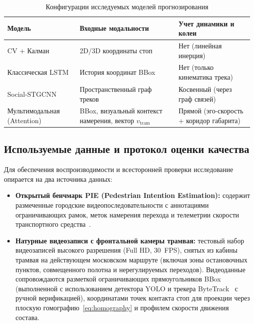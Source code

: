 \documentclass{misisarticle}
\begin{document}
\begin{table}[htbp]
  \caption{Конфигурации исследуемых моделей прогнозирования}
  \label{tab:models}
  \centering
  \begin{tabular}{p{}p{}p{}}
    \toprule
    \textbf{Модель} & \textbf{Входные модальности} & \textbf{Учет динамики и колеи} \\
    \toprule
    CV + Калман & 2D/3D координаты стоп & Нет (линейная инерция) \\
    Классическая LSTM & История координат BBox & Нет (только кинематика трека) \\
    Social-STGCNN & Пространственный граф треков & Косвенный (через граф связей) \\
    Мультимодальная (Attention) & BBox, визуальный контекст намерения, вектор $v_{\text{tram}}$ & Прямой (эго-скорость + коридор габарита) \\
    \bottomrule
  \end{tabular}
\end{table}

\subsection{Используемые данные и протокол оценки качества}

Для обеспечения воспроизводимости и всесторонней проверки исследование опирается на два источника данных:
\begin{itemize}
  \item \textbf{Открытый бенчмарк PIE (Pedestrian Intention Estimation):} содержит размеченные городские видеопоследовательности с аннотациями ограничивающих рамок, меток намерения перехода и телеметрии скорости транспортного средства~\cite{rasouli2019}.
  \item \textbf{Натурные видеозаписи с фронтальной камеры трамвая:} тестовый набор видеозаписей высокого разрешения (Full HD, $30$~FPS), снятых из кабины трамвая на действующем московском маршруте (включая зоны остановочных пунктов, совмещенного полотна и нерегулируемых переходов). Видеоданные сопровождаются разметкой ограничивающих прямоугольников BBox (выполненной с использованием детектора YOLO и трекера ByteTrack~\cite{zhang2022} с ручной верификацией), координатами точек контакта стоп для проекции через плоскую гомографию~\eqref{eq:homography} и профилем скорости движения состава.
\end{itemize}
\end{document}
